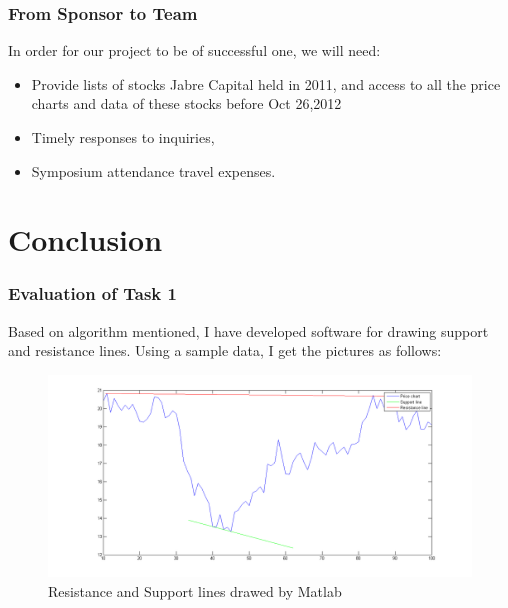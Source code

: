 \documentclass[compress,handout,10pt]{beamer}
\let\olditem\item
\renewcommand{\item}{\setlength{\itemsep}{0.5\baselineskip}\olditem}
\begin{document}
\begin{frame}
    \frametitle{From Sponsor to Team}
In order for our project to be of successful one, we will need:
\begin{itemize}
    \item Provide lists of stocks Jabre Capital held in 2011, and access to all the price charts and data of these stocks before Oct 26,2012
     \item Timely responses to inquiries, 
    \item Symposium attendance travel expenses.
\end{itemize}


\end{frame}

\section{Conclusion}
\begin{frame}
    \frametitle{Evaluation of Task 1}
Based on algorithm mentioned, I have developed software for drawing support and resistance lines. 
Using a sample data, I get the pictures as follows:
\begin{figure}[h]
    \begin{center}
        \includegraphics[width=\textwidth]{images/3.png}
    \end{center}
    \caption{Resistance and Support lines drawed by Matlab}
    \label{fig:rs}
\end{figure}  


\end{frame}
\end{document}
